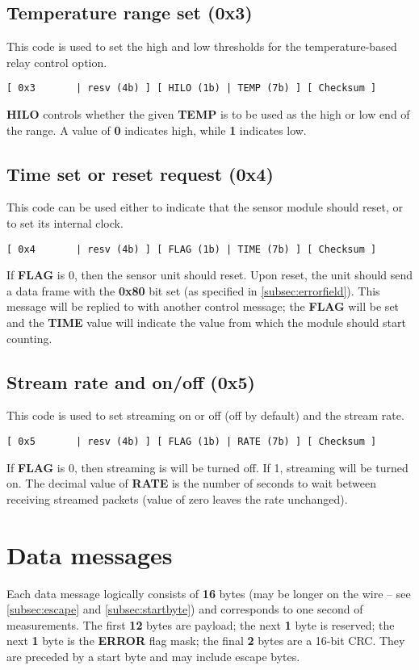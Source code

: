 \documentclass[11pt]{article}
\begin{document}
\subsection{Temperature range set (0x3)}
This code is used to set the high and low thresholds for the temperature-based relay control option.
\begin{verbatim}
[ 0x3       | resv (4b) ] [ HILO (1b) | TEMP (7b) ] [ Checksum ]
\end{verbatim}
\textbf{HILO} controls whether the given \textbf{TEMP} is to be used as the high or low end of the range. A value of \textbf{0} indicates high, while \textbf{1} indicates low.

\subsection{Time set or reset request (0x4)}
This code can be used either to indicate that the sensor module should reset, or to set its internal clock.
\begin{verbatim}
[ 0x4       | resv (4b) ] [ FLAG (1b) | TIME (7b) ] [ Checksum ]
\end{verbatim}
If \textbf{FLAG} is 0, then the sensor unit should reset. Upon reset, the unit should send a data frame with the \textbf{0x80} bit set (as specified in \ref{subsec:errorfield}). This message will be replied to with another control message; the \textbf{FLAG} will be set and the \textbf{TIME} value will indicate the value from which the module should start counting.

\subsection{Stream rate and on/off (0x5)}
\label{subsec:streamrate}
This code is used to set streaming on or off (off by default) and the stream rate.
\begin{verbatim}
[ 0x5       | resv (4b) ] [ FLAG (1b) | RATE (7b) ] [ Checksum ]
\end{verbatim}
If \textbf{FLAG} is 0, then streaming is will be turned off. If 1, streaming will be turned on. The decimal value of \textbf{RATE} is the number of seconds to wait between receiving streamed packets (value of zero leaves the rate unchanged).

\section{Data messages}
Each data message logically consists of \textbf{16} bytes (may be longer on the wire -- see \ref{subsec:escape} and \ref{subsec:startbyte}) and corresponds to one second of measurements. The first \textbf{12} bytes are payload; the next \textbf{1} byte is reserved; the next \textbf{1} byte is the \textbf{ERROR} flag mask; the final \textbf{2} bytes are a 16-bit CRC. They are preceded by a start byte and may include escape bytes.
\end{document}
